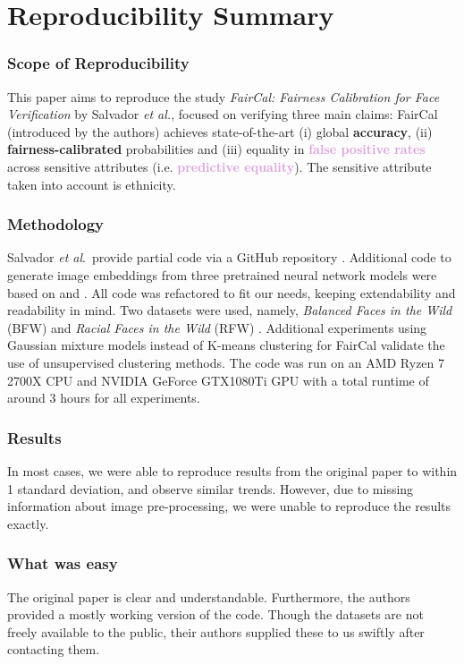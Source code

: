 \section*{\centering Reproducibility Summary}

\subsubsection*{Scope of Reproducibility}
This paper aims to reproduce the study \textit{FairCal: Fairness Calibration for Face Verification} by Salvador \textit{et al.}\citep{2106.03761}, focused on verifying three main claims: FairCal (introduced by the authors) achieves state-of-the-art (i) global \textcolor{Emerald}{\textbf{accuracy}}, (ii) \textcolor{Bittersweet}{\textbf{fairness-calibrated}} probabilities and (iii) equality in \textcolor{Plum}{\textbf{false positive rates}} across sensitive attributes (i.e. \textcolor{Plum}{\textbf{predictive equality}}). The sensitive attribute taken into account is ethnicity.

\subsubsection*{Methodology}
Salvador \textit{et al}.\ provide partial code via a GitHub repository \citep{faircalgithub}. Additional code to generate image embeddings from three pretrained neural network models were based on \citep{facenetpytorch} and \citep{arcface}. All code was refactored to fit our needs, keeping extendability and readability in mind. Two datasets were used, namely, \textit{Balanced Faces in the Wild} (BFW) \citep{robinson2020face}
and 
\textit{Racial Faces in the Wild} (RFW) \citep{Wang2019ICCV}. Additional experiments using Gaussian mixture models instead of K-means clustering for FairCal validate the use of unsupervised clustering methods. The code was run on an AMD Ryzen 7 2700X CPU and NVIDIA GeForce GTX1080Ti GPU with a total runtime of around 3 hours for all experiments.

\subsubsection*{Results}
In most cases, we were able to reproduce results from the original paper to within 1 standard deviation, and observe similar trends. However, due to missing information about image pre-processing, we were unable to reproduce the results exactly.

\subsubsection*{What was easy}
The original paper is clear and understandable. Furthermore, the authors provided a mostly working version of the code. Though the datasets are not freely available to the public, their authors supplied these to us swiftly after contacting them.

